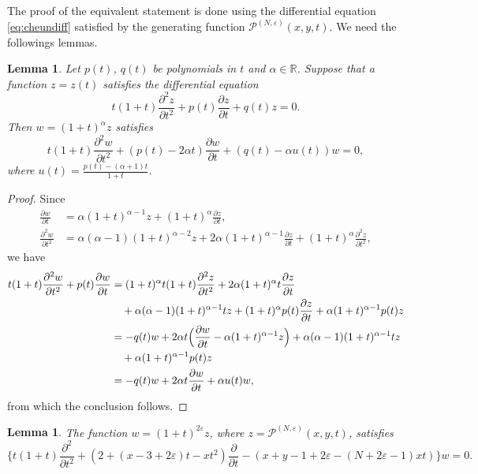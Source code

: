 \documentclass[11pt]{article}
\numberwithin{equation}{section}
\newcommand{\R}{\mathbb{R}} %
\newcommand{\e}{\varepsilon}
\newcommand{\Gncp}[1]{\mathscr{P}^{(#1)}} %
\theoremstyle{plain}
\newtheorem{lem}[thm]{Lemma}
\theoremstyle{definition}
\theoremstyle{remark}
\begin{document}
The proof of the equivalent statement is done using the differential equation \eqref{eq:cheundiff} satisfied
by the generating function \(\Gncp{N,\e}(x,y,t)\). We need the followings lemmas.

\begin{lem}\label{lem:diff eq of w}
  Let $p(t)$, $q(t)$ be polynomials in $t$ and $\alpha\in\R$.
  Suppose that a function $z=z(t)$ satisfies the differential equation
  \begin{equation*}
    t(1+t)\frac{\partial^2z}{\partial t^2}+p(t)\frac{\partial z}{\partial t}+q(t)z=0.
  \end{equation*}
  Then $w=(1+t)^\alpha z$ satisfies
\begin{equation*}
  t(1+t)\frac{\partial^2w}{\partial t^2}+(p(t)-2\alpha t)\frac{\partial w}{\partial t}+(q(t)-\alpha u(t))w=0,
\end{equation*}
where $u(t)=\frac{p(t)-(\alpha+1)t}{1+t}$.
\end{lem}

\begin{proof}
Since
\begin{align*}
  \frac{\partial w}{\partial t} &= \alpha(1+t)^{\alpha-1}z+(1+t)^{\alpha}\frac{\partial z}{\partial t}, \\
  \frac{\partial^2 w}{\partial t^2} &= \alpha(\alpha-1)(1+t)^{\alpha-2}z+2\alpha(1+t)^{\alpha-1}\frac{\partial z}{\partial t}+(1+t)^{\alpha}\frac{\partial^2 z}{\partial t^2},
\end{align*}
we have
\begin{align*}
  t(1+t)\frac{\partial^2w}{\partial t^2}+p(t)\frac{\partial w}{\partial t}  &=(1+t)^\alpha t(1+t)\frac{\partial^2z}{\partial t^2} +2\alpha(1+t)^\alpha t\frac{\partial z}{\partial t} \\
  &\quad +\alpha(\alpha-1)(1+t)^{\alpha-1}tz
    +(1+t)^{\alpha}p(t)\frac{\partial z}{\partial t} +\alpha(1+t)^{\alpha-1}p(t)z \\
  &=-q(t)w +2\alpha t\Bigl(\frac{\partial w}{\partial t}-\alpha(1+t)^{\alpha-1}z\Bigr) +\alpha(\alpha-1)(1+t)^{\alpha-1}tz \\
  &\quad +\alpha(1+t)^{\alpha-1}p(t)z  \\
  &=-q(t)w +2\alpha t\frac{\partial w}{\partial t} +\alpha u(t)w,
\end{align*}
from which the conclusion follows. 
\end{proof}

\begin{lem}\label{lem:z and w}
  The function $w=(1+t)^{2\e}z$, where $z=\Gncp{N,\e}(x,y,t)$, satisfies
  \begin{equation*}
    \biggl\{t(1+t)\frac{\partial^2}{\partial t^2}
    +(2+(x-3+2\e)t-xt^2)\frac{\partial}{\partial t}
    -(x+y-1+2\e-(N+2\e-1)xt)\biggr\}
    w=0.
  \end{equation*}
\end{lem}
\end{document}
